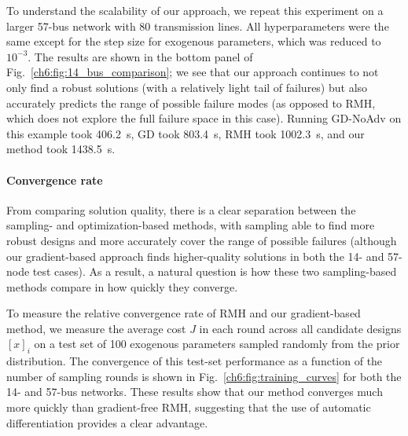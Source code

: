 To understand the scalability of our approach, we repeat this experiment on a larger 57-bus network with 80 transmission lines. All hyperparameters were the same except for the step size for exogenous parameters, which was reduced to $10^{-3}$. The results are shown in the bottom panel of Fig.~\ref{ch6:fig:14_bus_comparison}; we see that our approach continues to not only find a robust solutions (with a relatively light tail of failures) but also accurately predicts the range of possible failure modes (as opposed to RMH, which does not explore the full failure space in this case). Running GD-NoAdv on this example took \SI{406.2}{s}, GD took \SI{803.4}{s}, RMH took \SI{1002.3}{s}, and our method took \SI{1438.5}{s}.

\paragraph{Convergence rate} From comparing solution quality, there is a clear separation between the sampling- and optimization-based methods, with sampling able to find more robust designs and more accurately cover the range of possible failures (although our gradient-based approach finds higher-quality solutions in both the 14- and 57-node test cases). As a result, a natural question is how these two sampling-based methods compare in how quickly they converge.

To measure the relative convergence rate of RMH and our gradient-based method, we measure the average cost $J$ in each round across all candidate designs $[x]_i$ on a test set of 100 exogenous parameters sampled randomly from the prior distribution. The convergence of this test-set performance as a function of the number of sampling rounds is shown in Fig.~\ref{ch6:fig:training_curves} for both the 14- and 57-bus networks. These results show that our method converges much more quickly than gradient-free RMH, suggesting that the use of automatic differentiation provides a clear advantage.


